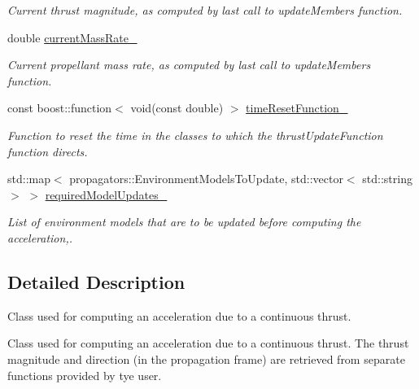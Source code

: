 \begin{DoxyCompactItemize}
\begin{DoxyCompactList}\small\item\em Current thrust magnitude, as computed by last call to update\+Members function. \end{DoxyCompactList}\item 
double \hyperlink{classtudat_1_1propulsion_1_1ThrustAcceleration_ad5c3392c221c16cd520041d3edd308b6}{current\+Mass\+Rate\+\_\+}\hypertarget{classtudat_1_1propulsion_1_1ThrustAcceleration_ad5c3392c221c16cd520041d3edd308b6}{}\label{classtudat_1_1propulsion_1_1ThrustAcceleration_ad5c3392c221c16cd520041d3edd308b6}

\begin{DoxyCompactList}\small\item\em Current propellant mass rate, as computed by last call to update\+Members function. \end{DoxyCompactList}\item 
const boost\+::function$<$ void(const double) $>$ \hyperlink{classtudat_1_1propulsion_1_1ThrustAcceleration_a0f94d46828ec0f2d9840aa7350c09e67}{time\+Reset\+Function\+\_\+}\hypertarget{classtudat_1_1propulsion_1_1ThrustAcceleration_a0f94d46828ec0f2d9840aa7350c09e67}{}\label{classtudat_1_1propulsion_1_1ThrustAcceleration_a0f94d46828ec0f2d9840aa7350c09e67}

\begin{DoxyCompactList}\small\item\em Function to reset the time in the classes to which the thrust\+Update\+Function function directs. \end{DoxyCompactList}\item 
std\+::map$<$ propagators\+::\+Environment\+Models\+To\+Update, std\+::vector$<$ std\+::string $>$ $>$ \hyperlink{classtudat_1_1propulsion_1_1ThrustAcceleration_aa83ab4b82166d24deea116386a9e55c1}{required\+Model\+Updates\+\_\+}
\begin{DoxyCompactList}\small\item\em List of environment models that are to be updated before computing the acceleration,. \end{DoxyCompactList}\end{DoxyCompactItemize}


\subsection{Detailed Description}
Class used for computing an acceleration due to a continuous thrust. 

Class used for computing an acceleration due to a continuous thrust. The thrust magnitude and direction (in the propagation frame) are retrieved from separate functions provided by tye user. 

